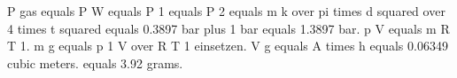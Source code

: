 P gas equals P W equals P 1 equals P 2 equals m k over pi times d squared over 4 times t squared equals 0.3897 bar plus 1 bar equals 1.3897 bar.  
p V equals m R T 1.  
m g equals p 1 V over R T 1 einsetzen.  
V g equals A times h equals 0.06349 cubic meters.  
equals 3.92 grams.
